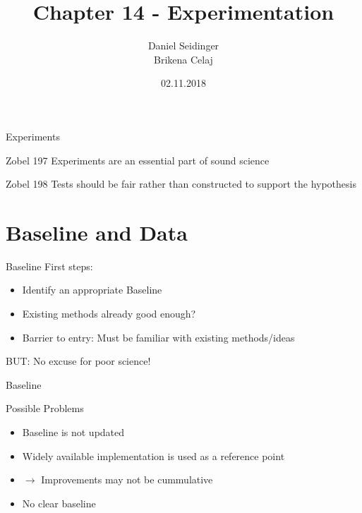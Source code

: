 \documentclass{beamer}
\title{Chapter 14 -  Experimentation}
\author{Daniel Seidinger\\
Brikena Celaj}
\date{02.11.2018}
\begin{document}
\begin{frame}
  \titlepage
\end{frame}

\begin{frame}{Experiments}
\begin{block}{Zobel 197}
Experiments are an essential part of sound science
\end{block}

\begin{block}{ Zobel 198}
Tests should be fair rather than constructed to support the hypothesis
\end{block}
\end{frame}

\section{Baseline and Data}
\begin{frame}{Baseline}
First steps:
\begin{itemize}
\item Identify an appropriate Baseline
\item Existing methods already good enough?
\item Barrier to entry: Must be familiar with existing methods/ideas 
\end{itemize}
BUT: No excuse for poor science!
\end{frame}

\begin{frame}{Baseline}
\begin{alertblock}{Possible Problems}
\begin{itemize}
\item Baseline is not updated 
\item Widely available implementation is used as a reference point
\item[] $\rightarrow$ Improvements may not be cummulative
\item No clear baseline
\end{itemize}
\end{alertblock}
\end{frame}
\end{document}
